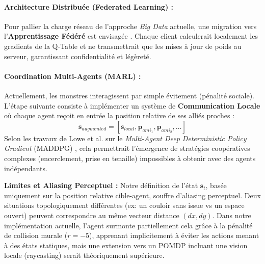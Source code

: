 \documentclass[12pt,a4paper]{article}
\newcommand{\state}{\mathbf{s}}
\begin{document}
\paragraph{Architecture Distribuée (Federated Learning) :}
Pour pallier la charge réseau de l'approche \textit{Big Data} actuelle, une migration vers l'\textbf{Apprentissage Fédéré} est envisagée \cite{mcmahan2017communication}. Chaque client calculerait localement les gradients de la Q-Table et ne transmettrait que les mises à jour de poids au serveur, garantissant confidentialité et légèreté.

\paragraph{Coordination Multi-Agents (MARL) :}
Actuellement, les monstres interagissent par simple évitement (pénalité sociale). L'étape suivante consiste à implémenter un système de \textbf{Communication Locale} où chaque agent reçoit en entrée la position relative de ses alliés proches :
\begin{equation}
    \state_{augmented} = [\state_{local}, \mathbf{p}_{ami_1}, \mathbf{p}_{ami_2}, \dots]
\end{equation}
Selon les travaux de Lowe et al. sur le \textit{Multi-Agent Deep Deterministic Policy Gradient} (MADDPG) \cite{lowe2017multi}, cela permettrait l'émergence de stratégies coopératives complexes (encerclement, prise en tenaille) impossibles à obtenir avec des agents indépendants.

\textbf{Limites et Aliasing Perceptuel :} 
Notre définition de l'état $\state_t$, basée uniquement sur la position relative cible-agent, souffre d'aliasing perceptuel. Deux situations topologiquement différentes (ex: un couloir sans issue vs un espace ouvert) peuvent correspondre au même vecteur distance $(dx, dy)$. 
Dans notre implémentation actuelle, l'agent surmonte partiellement cela grâce à la pénalité de collision murale ($r = -5$), apprenant implicitement à éviter les actions menant à des états statiques, mais une extension vers un POMDP incluant une vision locale (raycasting) serait théoriquement supérieure.
\end{document}
